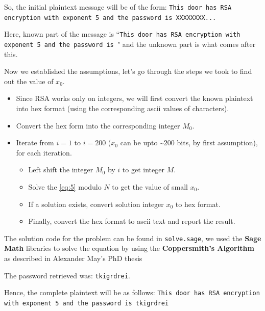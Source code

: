 \documentclass[10pt,twoside]{article}
\begin{document}
So, the initial plaintext message will be of the form: \newline
\texttt{This door has RSA encryption with exponent 5 and the password is XXXXXXXX...} \newline

Here, known part of the message is ``\texttt{This door has RSA encryption with exponent 5 and the password is }" and the unknown part is what comes after this. \newline

Now we established the assumptions, let's go through the steps we took to find out the value of $x_0$.

\begin{itemize}
  \setlength\itemsep{0em}
  \item Since RSA works only on integers, we will first convert the known plaintext into hex format (using the corresponding ascii values of characters).
  \item Convert the hex form into the corresponding integer $M_0$.
  \item Iterate from $i=1$ to $i=200$ ($x_0$ can be upto \textasciitilde$200$ bits, by first assumption), for each iteration.
    \begin{itemize}
      \setlength\itemsep{0em}
      \item Left shift the integer $M_0$ by $i$ to get integer $M$.
      \item Solve the \cref{eq:5} modulo $N$ to get the value of small $x_0$.
      \item If a solution exists, convert solution integer $x_0$ to hex format.
      \item Finally, convert the hex format to ascii text and report the result.
    \end{itemize}
\end{itemize}

The solution code for the problem can be found in \texttt{solve.sage}, we used the \textbf{Sage Math} libraries \cite{sagemath} to solve the equation by using the \textbf{Coppersmith's Algorithm} as described in Alexander May's PhD thesis \cite{alex} \newline 

The password retrieved was: \texttt{tkigrdrei}. \newline

Hence, the complete plaintext will be as follows: \newline
\texttt{This door has RSA encryption with exponent 5 and the password is tkigrdrei}
\end{document}
